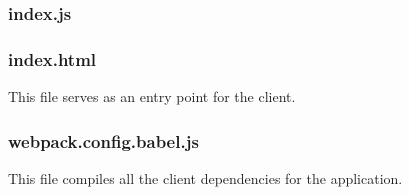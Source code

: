\subsubsection{index.js} %
\label{ssub:index_js}


\subsubsection{index.html} %
This file serves as an entry point for the client.


\subsubsection{webpack.config.babel.js} %
This file compiles all the client dependencies for the application.

